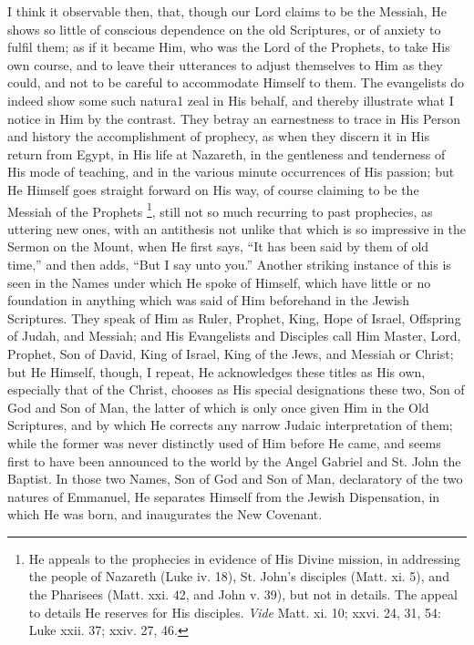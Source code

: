I think it observable then, that, though our Lord claims to be the
Messiah, He shows so little of conscious dependence on the old
Scriptures, or of anxiety to fulfil them; as if it became Him, who was
the Lord of the Prophets, to take His own course, and to leave their
utterances to adjust themselves to Him as they could, and not to be
careful to accommodate Himself to them. The evangelists do indeed show
some such natura1 zeal in His behalf, and thereby illustrate what I
notice in Him by the contrast. They betray an earnestness to trace in
His Person and history the accomplishment of prophecy, as when they
discern it in His return from Egypt, in His life at Nazareth, in the
gentleness and tenderness of His mode of teaching, and in the various
minute occurrences of His passion; but He Himself goes straight
forward on His way, of course claiming to be the Messiah of the
Prophets \footnote{He appeals to the prophecies in evidence of His Divine mission,
in addressing the people of Nazareth (Luke iv. 18), St. John's
disciples (Matt. xi. 5), and the Pharisees (Matt. xxi. 42, and John v.
39), but not in details. The appeal to details He reserves for His
disciples. \emph{Vide} Matt. xi. 10; xxvi. 24, 31, 54: Luke xxii. 37;
xxiv. 27, 46.}, still not so
much recurring to past prophecies, as uttering new ones, with an
antithesis not unlike that which is so impressive in the Sermon on the
Mount, when He first says, ``It has been said by them of old
time,'' and then adds, ``But I say unto you.'' Another
striking instance of this is seen in the Names under which He spoke of
Himself, which have little or no foundation in anything which
was said of Him beforehand in the Jewish Scriptures. They speak of Him
as Ruler, Prophet, King, Hope of Israel, Offspring of Judah, and
Messiah; and His Evangelists and Disciples call Him Master, Lord,
Prophet, Son of David, King of Israel, King of the Jews, and Messiah
or Christ; but He Himself, though, I repeat, He acknowledges these
titles as His own, especially that of the Christ, chooses as His
special designations these two, Son of God and Son of Man, the latter
of which is only once given Him in the Old Scriptures, and by which He
corrects any narrow Judaic interpretation of them; while the former
was never distinctly used of Him before He came, and seems first to
have been announced to the world by the Angel Gabriel and St. John the
Baptist. In those two Names, Son of God and Son of Man, declaratory of
the two natures of Emmanuel, He separates Himself from the Jewish
Dispensation, in which He was born, and inaugurates the New Covenant.


